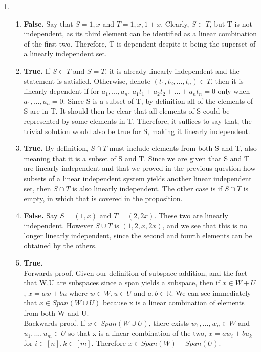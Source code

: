 \documentclass{article}
\begin{document}
\begin{enumerate}
\begin{enumerate}
\end{enumerate}

\item

\begin{enumerate}

\item \textbf{False.} Say that $S = {1,x}$ and $T = {1,x,1+x}$. Clearly, $S \subset T$, but T is not independent, as its third element can be identified as a linear combination of the first two. Therefore, T is dependent despite it being the superset of a linearly independent set.

\item \textbf{True.} If $S \subset T$ and $S = T$, it is already linearly independent and the statement is satisfied. Otherwise, denote $(t_1, t_2, ... ,t_n) \in T$, then it is linearly dependent if for $a_1, ..., a_n$, $a_1t_1 + a_2t_2 +... +a_nt_n = 0$ only when $a_1,...,a_n = 0$. Since S is a subset of T, by definition all of the elements of S are in T. It should then be clear that all elements of S could be represented by some elements in T. Therefore, it suffices to say that, the trivial solution would also be true for S, making it linearly independent.

\item \textbf{True.} By definition, $S \cap T$ must include elements from both S and T, also meaning that it is a subset of S and T. Since we are given that S and T are linearly independent and that we proved in the previous question how subsets of a linear independent system yields another linear independent set, then $S \cap T$ is also linearly independent. The other case is if $S \cap T$ is empty, in which that is covered in the proposition.

\item \textbf{False.} Say $S = (1,x)$ and $T = (2,2x)$. These two are linearly independent. However $S \cup T$ is $(1,2,x,2x)$, and we see that this is no longer linearly independent, since the second and fourth elements can be obtained by the others.

\item \textbf{True.} \\Forwards proof. Given our definition of subspace addition, and the fact that W,U are subspaces since a span yields a subspace, then if $x \in W + U$, $x = aw + bu$ where $w \in W, u \in U$ and $a,b \in \mathbb{R}$. We can see immediately that $x \in Span(W \cup U)$ because x is a linear combination of elements from both W and U. \\ Backwards proof. If $x \in Span(W \cup U)$, there exists $w_1,...,w_n \in W$ and $u_1,...,u_m \in U$ so that x is a linear combination of the two, $x = aw_i + bu_k$ for $i \in [n], k \in [m]$. Therefore $x \in Span(W) + Span(U)$.


\end{enumerate}
\end{enumerate}
\end{document}
